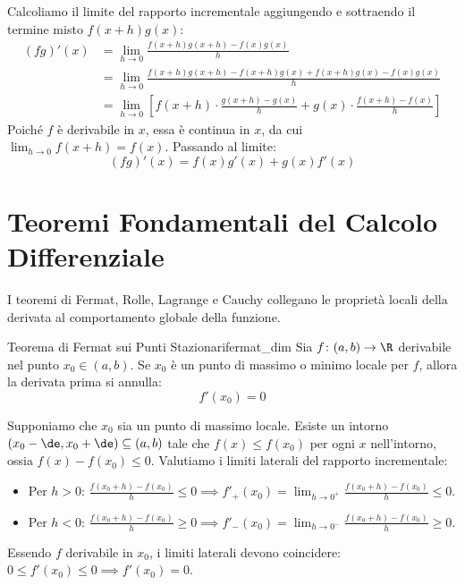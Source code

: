 \begin{dimostrazione}
Calcoliamo il limite del rapporto incrementale aggiungendo e sottraendo il termine misto $f(x+h)g(x)$:
\begin{align*}
    (fg)'(x) &= \lim_{h \to 0} \frac{f(x+h)g(x+h) - f(x)g(x)}{h} \\
    &= \lim_{h \to 0} \frac{f(x+h)g(x+h) - f(x+h)g(x) + f(x+h)g(x) - f(x)g(x)}{h} \\
    &= \lim_{h \to 0} \left[ f(x+h) \cdot \frac{g(x+h) - g(x)}{h} + g(x) \cdot \frac{f(x+h) - f(x)}{h} \right]
\end{align*}
Poiché $f$ è derivabile in $x$, essa è continua in $x$, da cui $\lim_{h \to 0} f(x+h) = f(x)$. Passando al limite:
\[
    (fg)'(x) = f(x)g'(x) + g(x)f'(x)
\]
\end{dimostrazione}

\section{Teoremi Fondamentali del Calcolo Differenziale}
\label{sec:teoremi_differenziali_dimostrazioni}

I teoremi di Fermat, Rolle, Lagrange e Cauchy collegano le proprietà locali della derivata al comportamento globale della funzione.

\begin{teorema}{Teorema di Fermat sui Punti Stazionari}{fermat_dim}
Sia $f \colon (a, b) \to \R$ derivabile nel punto $x_0 \in (a, b)$. Se $x_0$ è un punto di massimo o minimo locale per $f$, allora la derivata prima si annulla:
\[
    f'(x_0) = 0
\]
\end{teorema}

\begin{dimostrazione}
Supponiamo che $x_0$ sia un punto di massimo locale. Esiste un intorno $(x_0-\de, x_0+\de) \subseteq (a, b)$ tale che $f(x) \le f(x_0)$ per ogni $x$ nell'intorno, ossia $f(x) - f(x_0) \le 0$.
Valutiamo i limiti laterali del rapporto incrementale:
\begin{itemize}
    \item Per $h > 0$: $\frac{f(x_0+h) - f(x_0)}{h} \le 0 \implies f'_+(x_0) = \lim_{h \to 0^+} \frac{f(x_0+h)-f(x_0)}{h} \le 0$.
    \item Per $h < 0$: $\frac{f(x_0+h) - f(x_0)}{h} \ge 0 \implies f'_-(x_0) = \lim_{h \to 0^-} \frac{f(x_0+h)-f(x_0)}{h} \ge 0$.
\end{itemize}
Essendo $f$ derivabile in $x_0$, i limiti laterali devono coincidere: $0 \le f'(x_0) \le 0 \implies f'(x_0) = 0$.
\end{dimostrazione}

